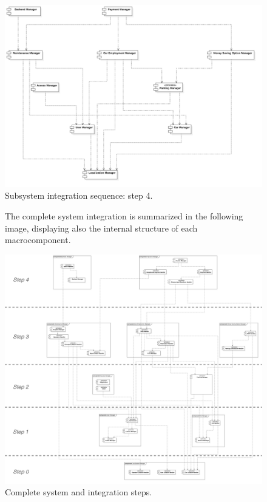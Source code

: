 		\begin{figure}[h]
			\par\bigskip
			\includegraphics[width=\textwidth,center]{img/integration_strategy/steps/high_level_components_lv4.png}
			\caption{Subsystem integration sequence: step 4.}
		\end{figure}
		\FloatBarrier

		\begin{figure}[h]
			The complete system integration is summarized in the following image, displaying also the internal structure of each macrocomponent.
			\par\bigskip
			\includegraphics[width=\textwidth,center]{img/integration_strategy/complete_unravelled-steps.png}
			\caption{Complete system and integration steps.}
		\end{figure}
		\FloatBarrier
